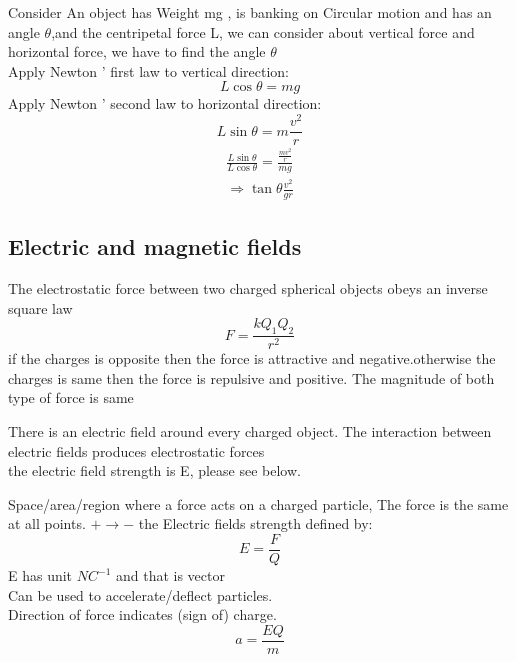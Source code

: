 \documentclass[a4paper]{article}
\begin{document}
\begin{ex}
Consider An object has Weight mg , is banking on Circular motion and has an angle $\theta$,and the centripetal force L, we can consider about vertical force and horizontal force, we have to find the angle $\theta$\\
Apply Newton ' first law to vertical direction:
\begin{equation*}
    L\cos\theta=mg
\end{equation*}
Apply Newton ' second law to horizontal direction:
\begin{equation*}
    L\sin\theta=m\frac{v^2}{r}
\end{equation*}
\begin{align*}
    \frac{L\sin\theta}{L\cos\theta}=\frac{\frac{mv^2}{r}}{mg}\\
    \Rightarrow \tan\theta\frac{v^2}{gr}
\end{align*}
\end{ex}




\subsection{Electric and magnetic fields}

\begin{defi}
The electrostatic force between two charged spherical objects obeys an inverse square law
\begin{equation*}
    F=\frac{kQ_1Q_2}{r^2}
\end{equation*}
if the charges is opposite then the force is attractive and negative.otherwise the charges is same then the force is repulsive and positive. The magnitude of both type of force is same
\end{defi}

\begin{defi}
There is an electric field around every charged object. The interaction between electric fields produces electrostatic forces\\
the electric field strength is E, please see below.
\end{defi}

\begin{defi}
Space/area/region where a force acts on a charged particle, The force is the same at all points.
$+\rightarrow-$
the Electric fields strength defined by:
\begin{equation*}
    E=\frac{F}{Q}
\end{equation*}
E has unit $NC^{-1}$ and that is vector\\
Can be used to accelerate/deflect particles.\\
Direction of force indicates (sign of) charge.
\begin{equation*}
    a=\frac{EQ}{m}
\end{equation*}
\end{defi}
\end{document}
